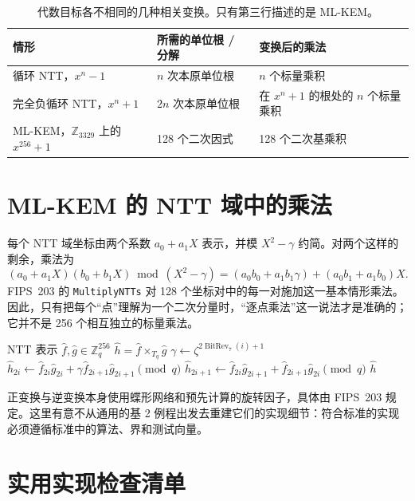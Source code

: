 \begin{table}[H]
\centering
\small
\begin{tabular}{p{}p{}p{}}
\toprule
情形 & 所需的单位根 / 分解 & 变换后的乘法 \\
\midrule
循环 NTT，$x^n-1$ & $n$ 次本原单位根 & $n$ 个标量乘积 \\
完全负循环 NTT，$x^n+1$ & $2n$ 次本原单位根 & 在 $x^n+1$ 的根处的 $n$ 个标量乘积 \\
ML-KEM，$\mathbb{Z}_{3329}$ 上的 $x^{256}+1$ & 128 个二次因式 & 128 个二次基乘积 \\
\bottomrule
\end{tabular}
\caption{代数目标各不相同的几种相关变换。只有第三行描述的是 ML-KEM。}
\label{tab:ntt-three-settings}
\end{table}

\section{ML-KEM 的 NTT 域中的乘法}

每个 NTT 域坐标由两个系数 $a_0+a_1X$ 表示，并模 $X^2-\gamma$ 约简。对两个这样的剩余，乘法为
\[
(a_0+a_1X)(b_0+b_1X)\bmod(X^2-\gamma)
= (a_0b_0+a_1b_1\gamma)+(a_0b_1+a_1b_0)X.
\]
FIPS~203 的 \texttt{MultiplyNTTs} 对 128 个坐标对中的每一对施加这一基本情形乘法。因此，只有把每个“点”理解为一个二次分量时，“逐点乘法”这一说法才是准确的；它并不是 256 个相互独立的标量乘法。

\begin{algorithm}[H]
\caption{ML-KEM 的 NTT 域乘法（概念形式）}
\label{alg:mlkem-base-multiply}
\begin{algorithmic}[1]
\Require NTT 表示 $\hat f,\hat g\in\mathbb{Z}_q^{256}$
\Ensure $\hat h=\hat f\times_{T_q}\hat g$
  \State $\gamma\gets\zeta^{2\operatorname{BitRev}_7(i)+1}$
  \State $\hat h_{2i}\gets \hat f_{2i}\hat g_{2i}+\gamma\hat f_{2i+1}\hat g_{2i+1}\pmod q$
  \State $\hat h_{2i+1}\gets \hat f_{2i}\hat g_{2i+1}+\hat f_{2i+1}\hat g_{2i}\pmod q$
\EndFor
\State \Return $\hat h$
\end{algorithmic}
\end{algorithm}

正变换与逆变换本身使用蝶形网络和预先计算的旋转因子，具体由 FIPS~203 规定。这里有意不从通用的基 2 例程出发去重建它们的实现细节：符合标准的实现必须遵循标准中的算法、界和测试向量。

\section{实用实现检查清单}


